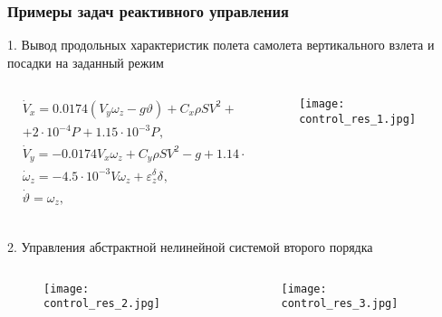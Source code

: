 \documentclass[default]{beamer}
\begin{document}
	\begin{frame}
		\frametitle{Примеры задач реактивного управления}

		1. Вывод продольных характеристик полета самолета вертикального взлета и посадки на заданный режим
		\vspace*{-0.5cm}
		\begin{columns}
			\begin{column}{0.45\textwidth}
				\begingroup
				\fontsize{7pt}{7pt}\selectfont
					\[\begin{matrix}
					& {{{\dot{V}}}_{x}}=0.0174({{V}_{y}}{{\omega }_{z}}-g\vartheta )+{{C}_{x}}\rho S{{V}^{2}}+\\
					&+2\cdot {{10}^{-4}}{{P}_{}}+1.15\cdot {{10}^{-3}}{{P}_{}}, \\ 
					& {{{\dot{V}}}_{y}}=-0.0174{{V}_{x}}{{\omega }_{z}}+{{C}_{y}}\rho S{{V}^{2}}-g+1.14\cdot {{10}^{-3}}{{P}_{}}, \\ 
					& {{{\dot{\omega }}}_{z}}=-4.5\cdot {{10}^{-3}}V{{\omega }_{z}}+\varepsilon _{z}^{{{\delta }_{}}}{{\delta }_{}}, \\ 
					& \dot{\vartheta }={{\omega }_{z}}, \\ 
					\end{matrix}\]
				\endgroup				
			\end{column}
			\begin{column}{0.55\textwidth}
				\begin{figure}
					\texttt{[image: control\_res\_1.jpg]}
				\end{figure}
			\end{column}
		\end{columns}
		
		2. Управления абстрактной нелинейной системой второго порядка 
		
		\begin{columns}
			\begin{column}{0.5\textwidth}
				\begin{figure}
					\texttt{[image: control\_res\_2.jpg]}
				\end{figure}
			\end{column}
			\begin{column}{0.5\textwidth}
				\begin{figure}
					\texttt{[image: control\_res\_3.jpg]}
				\end{figure}
			\end{column}
		\end{columns}
	\end{frame}
	
\end{document}

